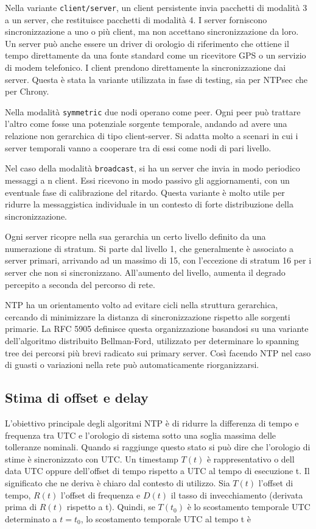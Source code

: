 Nella variante \texttt{client/server}, un client persistente invia pacchetti di
modalità 3 a un server, che restituisce pacchetti di modalità 4. I server forniscono
sincronizzazione a uno o più client, ma non accettano sincronizzazione da loro. Un
server può anche essere un driver di orologio di riferimento che ottiene il tempo
direttamente da una fonte standard come un ricevitore GPS o un servizio di modem telefonico.
I client prendono direttamente la sincronizzazione dai server. Questa è stata la variante utilizzata 
in fase di testing, sia per NTPsec che per Chrony.

Nella modalità \texttt{symmetric} due nodi operano come peer. Ogni peer 
può trattare l'altro come fosse una potenziale sorgente temporale, andando ad 
avere una relazione non gerarchica di tipo client-server. Si adatta molto a scenari in cui 
i server temporali vanno a cooperare tra di essi come nodi di pari livello.

Nel caso della modalità \texttt{broadcast}, si ha un server che invia in modo periodico 
messaggi a n client. Essi ricevono in modo passivo gli aggiornamenti, con un eventuale fase di 
calibrazione del ritardo. Questa variante è molto utile per ridurre la messaggistica individuale in un contesto
di forte distribuzione della sincronizzazione.

Ogni server ricopre nella sua gerarchia un certo livello definito da una numerazione di stratum.
Si parte dal livello 1, che generalmente è associato a server primari, arrivando ad un massimo di 15, con 
l'eccezione di stratum 16 per i server che non si sincronizzano. All'aumento del livello, aumenta 
il degrado percepito a seconda del percorso di rete.

NTP ha un orientamento volto ad evitare cicli nella struttura gerarchica, cercando di minimizzare la distanza 
di sincronizzazione rispetto alle sorgenti primarie. La RFC 5905 definisce questa organizzazione basandosi su una 
variante dell'algoritmo distribuito Bellman-Ford, utilizzato per determinare lo spanning tree dei percorsi più brevi 
radicato sui primary server. 
Così facendo NTP nel caso di guasti o variazioni nella rete può automaticamente riorganizzarsi.


\subsection{Stima di offset e delay}
L'obiettivo principale degli algoritmi NTP è di ridurre la differenza di tempo e frequenza 
tra UTC e l'orologio di sistema sotto una soglia massima delle tolleranze nominali. Quando si raggiunge questo 
stato si può dire che l'orologio di stime è sincronizzato con UTC.
Un timestamp $T(t)$ è rappresentativo o dell data UTC oppure dell'offset di tempo
rispetto a UTC al tempo di esecuzione t.
Il significato che ne deriva è chiaro dal contesto di utilizzo.
Sia $T(t)$ l'offset di tempo, $R(t)$ l'offset di frequenza
e $D(t)$ il tasso di invecchiamento (derivata prima di $R(t)$ rispetto a t). Quindi,
se $T(t_{0})$ è lo scostamento temporale UTC determinato a $t = t_{0}$, lo scostamento
temporale UTC al tempo t è

